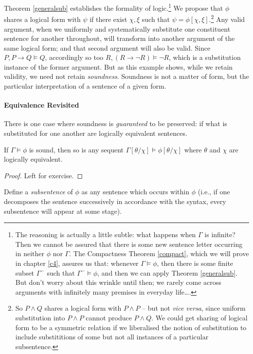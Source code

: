 Theorem \ref{generalsub} establishes the formality of logic.\footnote{The reasoning is actually a little subtle: what happens when $\Gamma$ is infinite? Then we cannot be assured that there is some new sentence letter occurring in neither $\phi$ nor $\Gamma$. The Compactness Theorem \ref{compact}, which we will prove in chapter \ref{c4}, assures us that: whenever $\Gamma \vDash \phi$, then there is some finite subset $\Gamma^{-}$ such that $\Gamma^{-} \vDash \phi$, and then we can apply Theorem \ref{generalsub}. But don't worry about this wrinkle until then; we rarely come across arguments with infinitely many premises in everyday life….} We propose that $\phi$ shares a logical form with $\psi$ if there exist $\chi,\xi$ such that $\psi = \phi[\chi,\xi]$.\footnote{So $P \wedge Q$ shares a logical form with $P \wedge P$ – but not \emph{vice versa}, since uniform substitution into $P \wedge P$ cannot produce $P \wedge Q$. We could get sharing of logical form to be a symmetric relation if we liberalised the notion of substitution to include substititions of some but not all instances of a particular subsentence.} Any valid argument, when we uniformly and systematically substitute one constituent sentence for another throughout, will transform into another argument of the same logical form; and that second argument will also be valid. Since $P, P\to Q \vDash Q$, accordingly so too $R, (R \to \neg R) \vDash \neg R$, which is a substitution instance of the former argument. But as this example shows, while we retain validity, we need not retain \emph{soundness}. Soundness is not a matter of form, but the particular interpretation of a sentence of a given form. 

\paragraph{Equivalence Revisited}
There is one case where soundness is \emph{guaranteed} to be preserved: if what is substituted for one another are logically equivalent sentences. \begin{theorem}[Equivalents] \label{equivalents}
	 If $\Gamma \vDash \phi$ is sound, then so is any sequent $\Gamma[\theta/\chi] \vDash \phi[\theta/\chi]$ where $\theta$ and $\chi$ are logically
	equivalent. \begin{proof}
Left for exercise.\end{proof}
\end{theorem}

Define a \emph{subsentence} of $\phi$ as any sentence which occurs within $\phi$ (i.e., if one decomposes the sentence successively in accordance with the syntax, every subsentence will appear at some stage). 

